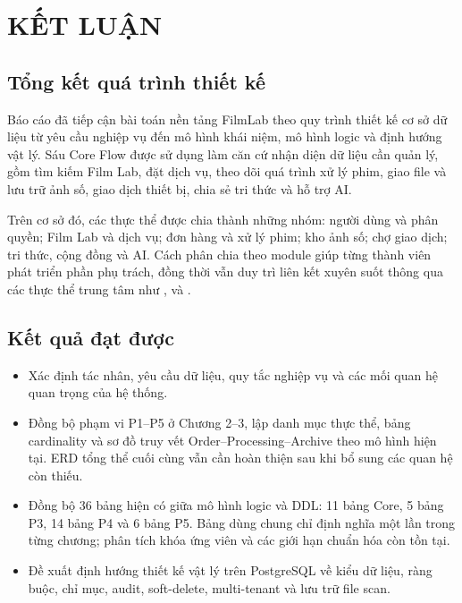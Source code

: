 \chapter{KẾT LUẬN}

\section{Tổng kết quá trình thiết kế}

Báo cáo đã tiếp cận bài toán nền tảng FilmLab theo quy trình thiết kế cơ sở dữ liệu từ yêu cầu nghiệp vụ đến mô hình khái niệm, mô hình logic và định hướng vật lý. Sáu Core Flow được sử dụng làm căn cứ nhận diện dữ liệu cần quản lý, gồm tìm kiếm Film Lab, đặt dịch vụ, theo dõi quá trình xử lý phim, giao file và lưu trữ ảnh số, giao dịch thiết bị, chia sẻ tri thức và hỗ trợ AI.

Trên cơ sở đó, các thực thể được chia thành những nhóm: người dùng và phân quyền; Film Lab và dịch vụ; đơn hàng và xử lý phim; kho ảnh số; chợ giao dịch; tri thức, cộng đồng và AI. Cách phân chia theo module giúp từng thành viên phát triển phần phụ trách, đồng thời vẫn duy trì liên kết xuyên suốt thông qua các thực thể trung tâm như ,  và .

\section{Kết quả đạt được}

\begin{itemize}
    \item Xác định tác nhân, yêu cầu dữ liệu, quy tắc nghiệp vụ và các mối quan hệ quan trọng của hệ thống.
    \item Đồng bộ phạm vi P1--P5 ở Chương 2--3, lập danh mục thực thể, bảng cardinality và sơ đồ truy vết Order--Processing--Archive theo mô hình hiện tại. ERD tổng thể cuối cùng vẫn cần hoàn thiện sau khi bổ sung các quan hệ còn thiếu.
    \item Đồng bộ 36 bảng hiện có giữa mô hình logic và DDL: 11 bảng Core, 5 bảng P3, 14 bảng P4 và 6 bảng P5. Bảng dùng chung chỉ định nghĩa một lần trong từng chương; phân tích khóa ứng viên và các giới hạn chuẩn hóa còn tồn tại.
    \item Đề xuất định hướng thiết kế vật lý trên PostgreSQL về kiểu dữ liệu, ràng buộc, chỉ mục, audit, soft-delete, multi-tenant và lưu trữ file scan.
\end{itemize}

